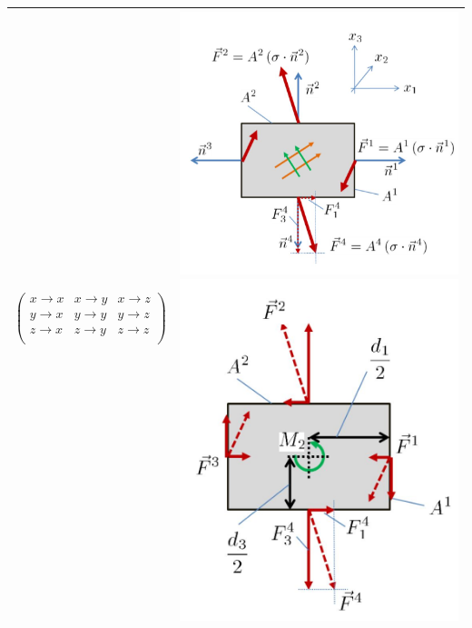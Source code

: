 \begin{tabularx}{ \columnwidth} {p{4cm}lX}
	$\begin{pmatrix}
	x\to x & x\to y & x\to z \\
	y\to x & y\to y & y\to z \\
	z\to x & z\to y & z\to z \\		
	\end{pmatrix}$&
	\multicolumn{2}{l}{\vspace{0cm}\includegraphics[scale=.15]{images/3Dcuttingforces} \includegraphics[scale=.15]{images/3Dangularmomentum}}	\\
	\hline 
\end{tabularx}
	\renewcommand{\arraystretch}{2}
